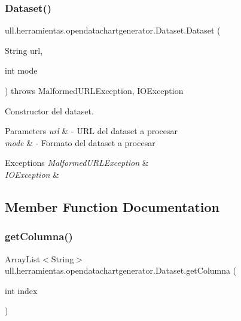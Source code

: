 \subsubsection{\texorpdfstring{Dataset()}{Dataset()}}
{\footnotesize\ttfamily ull.\+herramientas.\+opendatachartgenerator.\+Dataset.\+Dataset (\begin{DoxyParamCaption}\item[{String}]{url,  }\item[{int}]{mode }\end{DoxyParamCaption}) throws Malformed\+U\+R\+L\+Exception, I\+O\+Exception}



Constructor del dataset. 


\begin{DoxyParams}{Parameters}
{\em url} & -\/ U\+RL del dataset a procesar \\
\hline
{\em mode} & -\/ Formato del dataset a procesar \\
\hline
\end{DoxyParams}

\begin{DoxyExceptions}{Exceptions}
{\em Malformed\+U\+R\+L\+Exception} & \\
\hline
{\em I\+O\+Exception} & \\
\hline
\end{DoxyExceptions}


\subsection{Member Function Documentation}
\mbox{\label{classull_1_1herramientas_1_1opendatachartgenerator_1_1_dataset_a9de53a532ec00647171d6dd7a614d1ef}} 
\subsubsection{\texorpdfstring{get\+Columna()}{getColumna()}}
{\footnotesize\ttfamily Array\+List$<$String$>$ ull.\+herramientas.\+opendatachartgenerator.\+Dataset.\+get\+Columna (\begin{DoxyParamCaption}\item[{int}]{index }\end{DoxyParamCaption})}



